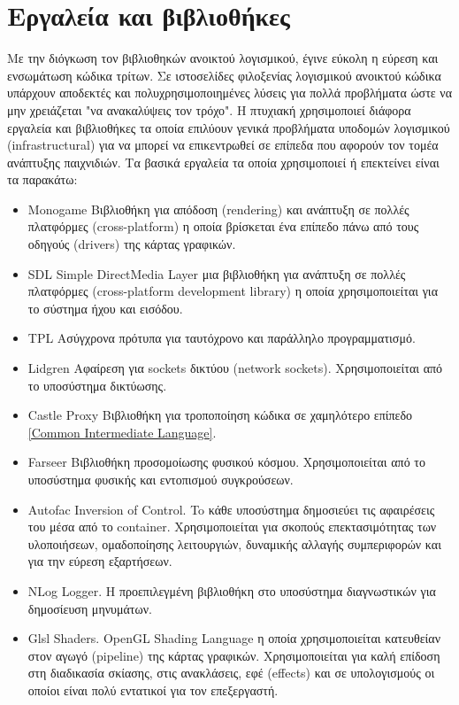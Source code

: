 \section{Εργαλεία και βιβλιοθήκες}
Με την διόγκωση τον βιβλιοθηκών ανοικτού λογισμικού, έγινε εύκολη η εύρεση και ενσωμάτωση κώδικα τρίτων. Σε ιστοσελίδες φιλοξενίας λογισμικού ανοικτού κώδικα υπάρχουν αποδεκτές και πολυχρησιμοποιημένες λύσεις για πολλά προβλήματα ώστε να μην χρειάζεται "να ανακαλύψεις τον τρόχο". Η πτυχιακή χρησιμοποιεί διάφορα εργαλεία και βιβλιοθήκες τα οποία επιλύουν γενικά προβλήματα υποδομών λογισμικού (infrastructural) για να μπορεί να επικεντρωθεί σε επίπεδα που αφορούν τον τομέα ανάπτυξης παιχνιδιών. Τα βασικά εργαλεία τα οποία χρησιμοποιεί ή επεκτείνει είναι τα παρακάτω:
\begin{itemize}
	\item{Monogame} Βιβλιοθήκη για απόδοση (rendering)  και ανάπτυξη σε πολλές πλατφόρμες (cross-platform) η οποία βρίσκεται ένα επίπεδο πάνω από τους οδηγούς (drivers) της κάρτας γραφικών.
	\item{SDL} Simple DirectMedia Layer μια βιβλιοθήκη για ανάπτυξη σε πολλές πλατφόρμες (cross-platform development library) η οποία χρησιμοποιείται για το σύστημα ήχου και εισόδου.
	\item{TPL} Ασύγχρονα πρότυπα για ταυτόχρονο και παράλληλο προγραμματισμό.
	\item{Lidgren} Αφαίρεση για sockets δικτύου (network sockets). Χρησιμοποιείται από το υποσύστημα δικτύωσης.
	\item{Castle Proxy} Βιβλιοθήκη για τροποποίηση κώδικα σε χαμηλότερο επίπεδο \ref{Common Intermediate Language}.
	\item{Farseer} Βιβλιοθήκη προσομοίωσης φυσικού κόσμου. Χρησιμοποιείται από το υποσύστημα φυσικής και εντοπισμού συγκρούσεων.
	\item{Autofac} Inversion of Control. To κάθε υποσύστημα δημοσιεύει τις αφαιρέσεις του μέσα από το container. Χρησιμοποιείται για σκοπούς επεκτασιμότητας των υλοποιήσεων, ομαδοποίησης λειτουργιών, δυναμικής αλλαγής συμπεριφορών και για την εύρεση εξαρτήσεων.
	\item{NLog} Logger. H προεπιλεγμένη βιβλιοθήκη στο υποσύστημα διαγνωστικών για δημοσίευση μηνυμάτων.
	\item{Glsl} Shaders. OpenGL Shading Language η οποία χρησιμοποιείται κατευθείαν στον αγωγό (pipeline) της κάρτας γραφικών. Χρησιμοποιείται για καλή επίδοση στη διαδικασία σκίασης, στις ανακλάσεις, εφέ (effects) και σε υπολογισμούς οι οποίοι είναι πολύ εντατικοί για τον επεξεργαστή.

\end{itemize}
